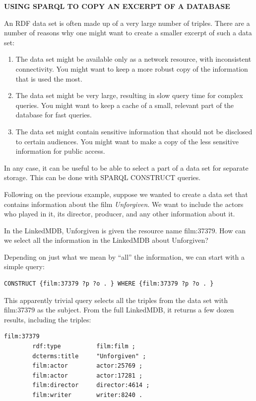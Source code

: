 \begin{challenge}
\textbf{USING SPARQL TO COPY AN EXCERPT OF A DATABASE}
\label{chal:4}

An RDF data set is often made up of a very large number of triples.
There are a number of reasons why one might want to create a smaller
excerpt of such a data set:

\begin{enumerate}
\item  The data set might be available only as a network resource, with
inconsistent connectivity. You might want to keep a more robust copy of
the information that is used the most.

\item  The data set might be very large, resulting in slow query time for
complex queries. You might want to keep a cache of a small, relevant
part of the database for fast queries.

\item  The data set might contain sensitive information that should not be
disclosed to certain audiences. You might want to make a copy of the less sensitive information for public access.
\end{enumerate}


In any case, it can be useful to be able to select a part of a data set
for separate storage. This can be done with
SPARQL CONSTRUCT queries.

Following on the previous example, suppose we wanted to create a data
set that contains information about the film \emph{Unforgiven}. We want
to include the actors who played in it, its director, producer, and any
other information about it.

In the LinkedMDB, Unforgiven is given the resource name film:37379. How
can we select all the information in the LinkedMDB about Unforgiven?

Depending on just what we mean by ``all'' the information, we can start
with a simple query:

\begin{lstlisting}
CONSTRUCT {film:37379 ?p ?o . } WHERE {film:37379 ?p ?o . }
\end{lstlisting}

This apparently trivial query selects all the triples from the data set
with film:37379 as the subject. From the full LinkedMDB, it returns a
few dozen results, including the triples:

\begin{lstlisting}
film:37379  
        rdf:type          film:film ;
        dcterms:title     "Unforgiven" ;
        film:actor        actor:25769 ;
        film:actor        actor:17281 ;
        film:director     director:4614 ;
        film:writer       writer:8240 .
\end{lstlisting}


\end{challenge}
